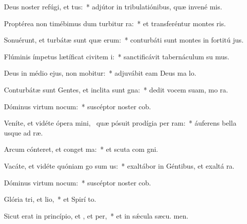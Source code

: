 \item Deus noster refúgi, et tus:~* adjútor in tribulatiónibus, quæ invené  mis.
\item Proptérea non timébimus dum turbitur ra:~* et transferéntur montes   ris.
\item Sonuérunt, et turbátæ sunt quæ erum:~* conturbáti sunt montes in fortitú jus.
\item Flúminis ímpetus lætíficat civitem i:~* sanctificávit tabernáculum su mus.
\item Deus in médio ejus, non mobitur:~* adjuvábit eam Deus ma lo.
\item Conturbátæ sunt Gentes, et inclita sunt gna:~* dedit vocem suam, mo  ra.
\item Dóminus virtum nocum:~* suscéptor noster  cob.
\item Veníte, et vidéte ópera mini,~\pscross{} quæ pósuit prodígia per ram:~* áuferens bella usque ad  ræ.
\item Arcum cónteret, et conget ma:~* et scuta com gni.
\item Vacáte, et vidéte quóniam go sum us:~* exaltábor in Géntibus, et exaltá  ra.
\item Dóminus virtum nocum:~* suscéptor noster  cob.
\item Glória tri, et lio,~* et Spirí to.
\item Sicut erat in princípio, et , et per,~* et in sǽcula sæcu. men.
